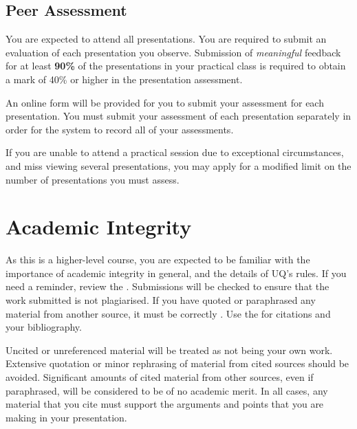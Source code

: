 \documentclass{csse4400}
\begin{document}
\subsection{Peer Assessment}
You are expected to attend all presentations.
You are required to submit an evaluation of each presentation you observe.
Submission of \emph{meaningful} feedback for at least \textbf{90\%} of the presentations in your practical class
is required to obtain a mark of 40\% or higher in the presentation assessment.

An online form will be provided for you to submit your assessment for each presentation.
You must submit your assessment of each presentation separately in order for the system to record all of your assessments.

If you are unable to attend a practical session due to exceptional circumstances,
and miss viewing several presentations,
you may apply for a modified limit on the number of presentations you must assess.

\section{Academic Integrity}
As this is a higher-level course, you are expected to be familiar with the importance of academic integrity in general, and the details of UQ's rules.
If you need a reminder, review the .
Submissions will be checked to ensure that the work submitted is not plagiarised.
If you have quoted or paraphrased any material from another source, it must be correctly .
Use the  for citations and your bibliography.

Uncited or unreferenced material will be treated as not being your own work.
Extensive quotation or minor rephrasing of material from cited sources should be avoided.
Significant amounts of cited material from other sources, even if paraphrased, will be considered to be of no academic merit.
In all cases, any material that you cite must support the arguments and points that you are making in your presentation.
\end{document}
